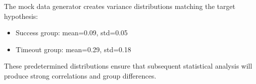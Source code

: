 The mock data generator creates variance distributions matching the target hypothesis:
\begin{itemize}
\item Success group: mean=0.09, std=0.05
\item Timeout group: mean=0.29, std=0.18
\end{itemize}

These predetermined distributions ensure that subsequent statistical analysis will produce strong correlations and group differences.
